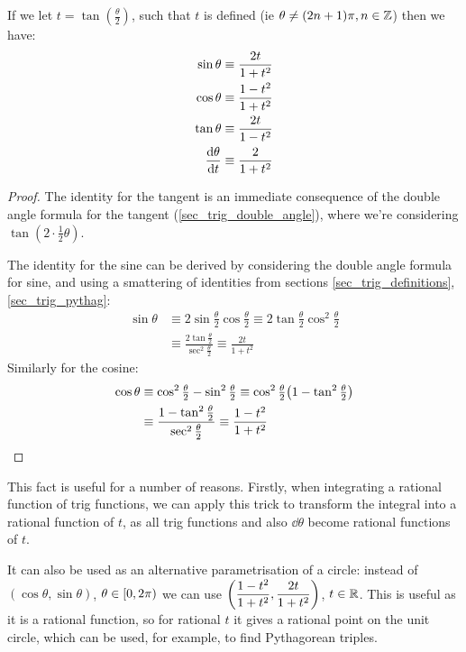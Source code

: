 \begin{theorem}
If we let \(t = \tan(\frac \theta 2)\), such that \(t\) is defined (ie
\(\theta \ne (2n + 1)\pi, n \in \mathbb Z\)) then we have:
\begin{align*}
\sin \theta &\equiv \dfrac{2t}{1 + t^2} \\
\cos \theta &\equiv \dfrac{1 - t^2}{1 + t^2} \\
\tan \theta &\equiv \dfrac{2t}{1 - t^2} \\
\dv{\theta}{t} &\equiv \dfrac{2}{1 + t^2}
\end{align*}
\end{theorem}
\begin{proof}
The identity for the tangent is an immediate consequence of the double
angle formula for the tangent (\ref{sec_trig_double_angle}), where we're
considering \(\tan(2 \cdot \frac 12 \theta)\).

The identity for the sine can be derived by considering the double angle
formula for sine, and using a smattering of identities from sections
\ref{sec_trig_definitions}, \ref{sec_trig_pythag}:
\begin{align*}
\sin \theta &\equiv 2\sin \tfrac \theta 2 \cos\tfrac \theta 2
    \equiv 2\tan \tfrac \theta 2 \cos^2 \tfrac \theta 2 \\
    &\equiv \frac{2\tan \frac \theta 2}{\sec^2 \frac \theta 2}
    \equiv \frac{2t}{1 + t^2}
\end{align*}
Similarly for the cosine:
\begin{align*}
\cos \theta
    &\equiv \cos^2 \tfrac \theta 2 - \sin^2 \tfrac \theta 2
    \equiv \cos^2 \tfrac \theta 2
        \pqty{1 - \tan^2 \tfrac \theta 2} \\
    &\equiv \frac{1 - \tan^2 \tfrac \theta 2}
                 {\sec^2 \tfrac \theta 2}
    \equiv \frac{1 - t^2}{1 + t^2} \qedhere
\end{align*}
\end{proof}

This fact is useful for a number of reasons. Firstly, when integrating a
rational function of trig functions, we can apply this trick to transform
the integral into a rational function of \(t\), as all trig functions and
also \(\dd{\theta}\) become rational functions of \(t\).

It can also be used as an alternative parametrisation of a circle: instead
of \((\cos\theta, \sin\theta)\), \(\theta \in [0, 2\pi)\) we can use
\(\pqty{\dfrac{1 - t^2}{1 + t^2}, \dfrac{2t}{1 + t^2}}\), \(t \in \mathbb R\).
This is useful as it is a rational function, so for rational \(t\) it gives
a rational point on the unit circle, which can be used, for example, to find
Pythagorean triples.

